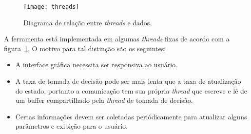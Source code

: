 \begin{figure}[ht]
  \centering
  \texttt{[image: threads]}
  \caption{Diagrama de relação entre \textit{threads} e
  dados.}\label{fig:arch-threads}
\end{figure}

A ferramenta está implementada em algumas \textit{threads} fixas de acordo com a
figura~\ref{fig:arch-threads}.  O motivo para tal distinção são os seguintes:

\begin{itemize}
  \item A interface gráfica necessita ser responsiva ao usuário.
  \item A taxa de tomada de decisão pode ser mais lenta que a taxa de
    atualização do estado, portanto a comunicação tem sua própria
    \textit{thread} que escreve e lê de um buffer compartilhado pela
    \textit{thread} de tomada de decisão.
  \item Certas informações devem ser coletadas periódicamente para atualizar
    alguns parâmetros e exibição para o usuário.
\end{itemize}


